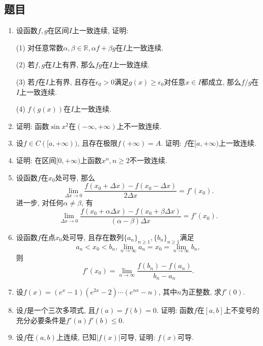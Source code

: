 \documentclass[UTF8,11pt, a4paper, oneside, fontset=none]{ctexbook}
\begin{document}
\subsection*{题目}
\begin{enumerate}
\item 设函数$f, g$在区间$I$上一致连续, 证明:

(1) 对任意常数$\alpha, \beta \in \mathbb R, \alpha f + \beta g$在$I$上一致连续.

(2) 若$f, g$在$I$上有界, 那么$fg$在$I$上一致连续.

(3) 若$f$在$I$上有界, 且存在$\epsilon_0 > 0$满足$g(x) \geq \epsilon_0$对任意$x \in I$都成立, 那么$f/g$在$I$上一致连续.

(4) $f(g(x))$在$I$上一致连续.

\item 证明: 函数$\sin x^2$在$(-\infty, +\infty)$上不一致连续.

\item 设$f \in C([a, +\infty))$, 且存在极限$f(+\infty) = A$. 证明: $f$在$[a, +\infty)$上一致连续.

\item 证明: 在区间$[0, +\infty)$上函数$x^n, n \geq 2$不一致连续. 

\item 设函数$f$在$x_0$处可导, 那么
\[
\lim_{\Delta x \to 0} \frac{f(x_0 + \Delta x) - f(x_0 - \Delta x)}{2 \Delta x} = f'(x_0).
\]
进一步, 对任何$\alpha \neq \beta$, 有
\[
\lim_{\Delta x \to 0} \frac{f(x_0 + \alpha\Delta x) - f(x_0 + \beta \Delta x)}{(\alpha - \beta) \Delta x} = f'(x_0).
\]

\item 设函数$f$在点$x_0$处可导, 且存在数列$\{ a_n\}_{n \geq 1}, \{ b_n\}_{n \geq 1}$满足
\[
a_n < x_0 < b_n, \lim_{n \to \infty} a_n = x_0 = \lim_{n \to \infty} b_n,
\]
则
\[
f'(x_0) = \lim_{n \to \infty} \frac{f(b_n) - f(a_n)}{b_n - a_n}.
\]

\item 设$f(x) = (e^x-1)(e^{2x}-2) \cdots (e^{nx} -n)$, 其中$n$为正整数, 求$f'(0)$.

\item 设$f$是一个三次多项式, 且$f(a) =f(b) =0$. 证明: 函数$f$在$[a, b]$上不变号的充分必要条件是$f'(a) f'(b) \leq 0$.

\item 设$f$在$(a, b)$上连续, 已知$|f(x)|$可导, 证明: $f(x)$可导.


\end{enumerate}
\end{document}

